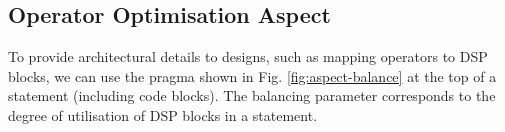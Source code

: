 \begin{comment}
\lstset{style=lara}
\begin{figure}[!h]
\begin{lstlisting}
aspectdef AspReconfig
input
   partition
end
select function.call end
apply
   if ($call.key in partition) {
      var cfg = partition[$call.key].cfg;
      var hw = partition[$call.key].hw;
      $call.insert before %{
         #pragma FAST hw:[[hw]] cfg:[[cfg]]
      }%;
   }
end
end
\end{lstlisting}
\caption{Reconfiguration aspect.}
\label{fig:aspect-reconf}
\end{figure}

Table \ref{fig:aspect-hash} shows an example of a hash table
representing a hardware partition. The key (e.g. main:f:1) identifies
a function call in the application, and is formed by concatenating the
name of the caller function (main), the name of the invoked function
(e.g. f) and a unique number (1).  Line~5 in the aspect shown in
Fig.~\ref{fig:aspect-reconf} selects all function calls, and for each
call found in the input partition (line~7), we set the appropriate
pragma on top of the call statement (lines 10--12). We can now realize
and experiment different reconfiguration designs by invoking this
aspect with different hardware partitions.


\begin{table}[!h]
\caption{An example of a hardware partition, represented as a hash
  table, used with the reconfiguration aspect
  (Fig.~\ref{fig:aspect-reconf})}
\label{fig:aspect-hash}
\centering
\begin{tabular}{c|c|c}
\hline
\multicolumn{3}{c}{\bf{partition}} \\
\hline
\bf{\$call.key} & \bf{hw} & \bf{cfg}  \\
\hline
main:f:1 & fast\_f0 & c0 \\
main:f:2 & fast\_f1 & c1 \\
main:g:3 & fast\_g & c1 \\
\hline
\end{tabular}
\end{table}

\end{comment}

\subsection{Operator Optimisation Aspect}
\label{sect:asp_ops}
To provide architectural details to \FAST{} designs, such as mapping
operators to DSP blocks, we can use the \FAST{} pragma shown in
Fig. \ref{fig:aspect-balance} at the top of a statement (including code
blocks). The balancing parameter corresponds to the degree of
utilisation of DSP blocks in a statement.

